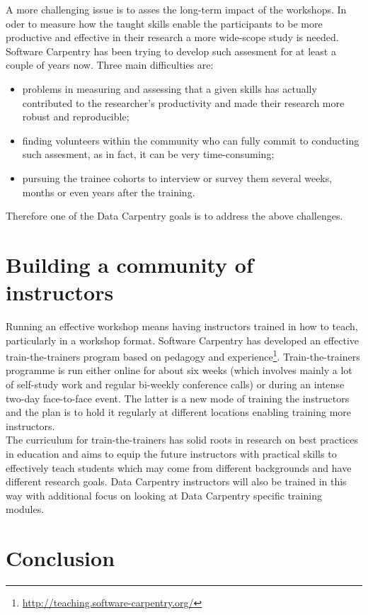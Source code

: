 \documentclass[15]{idcc}
\begin{document}
\begin{itemize}
A more challenging issue is to asses the long-term impact of the workshops. In oder to measure how the taught skills enable the participants to 
be more productive and effective in their research a more wide-scope study is needed. Software Carpentry has been trying to develop such assesment
for at least a couple of years now. Three main difficulties are:
\begin{itemize}
\item problems in measuring and assessing that a given skills has actually contributed to the researcher's productivity and made their research more robust and reproducible;
\item finding volunteers within the community who can fully commit to conducting such assesment, as in fact, it can be very time-consuming;
\item pursuing the trainee cohorts to interview or survey them several weeks, months or even years after the training.
\end{itemize}

Therefore one of the Data Carpentry goals is to address the above challenges. 


\section{Building a community of instructors}
Running an effective workshop means having instructors trained in how to teach, particularly in a workshop format. Software Carpentry has developed
 an effective train-the-trainers program based on pedagogy and experience\footnote{\url{http://teaching.software-carpentry.org/}}. Train-the-trainers programme is run either online for about six weeks
 (which involves mainly a lot of self-study work and regular bi-weekly conference calls) or during an intense two-day face-to-face event. The latter 
is a new mode of training the instructors and the plan is to hold it regularly at different locations enabling training more instructors. \\

The curriculum for train-the-trainers has solid roots in research on best practices in education and aims to equip the future instructors with practical
skills to effectively teach students which may come from different backgrounds and have different research goals. Data Carpentry instructors will 
also be trained in this way with additional focus on looking at Data Carpentry specific training modules.  

\section{Conclusion}



\end{itemize}
\end{document}

